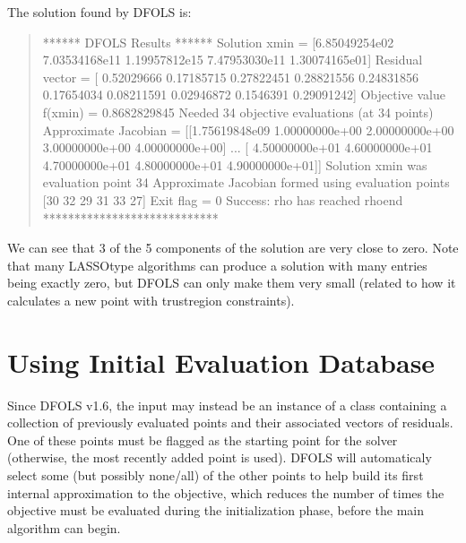 \documentclass[letterpaper,10pt,english]{sphinxmanual}
\begin{document}
\sphinxAtStartPar
The solution found by DFO\sphinxhyphen{}LS is:
\begin{quote}

\begin{sphinxVerbatim}[commandchars=\\\{\}]
****** DFO\PYGZhy{}LS Results ******
Solution xmin = [\PYGZhy{}6.85049254e\PYGZhy{}02 \PYGZhy{}7.03534168e\PYGZhy{}11  1.19957812e\PYGZhy{}15  7.47953030e\PYGZhy{}11
  1.30074165e\PYGZhy{}01]
Residual vector = [ 0.52029666 \PYGZhy{}0.17185715 \PYGZhy{}0.27822451 \PYGZhy{}0.28821556 \PYGZhy{}0.24831856 \PYGZhy{}0.17654034
 \PYGZhy{}0.08211591  0.02946872  0.1546391   0.29091242]
Objective value f(xmin) = 0.8682829845
Needed 34 objective evaluations (at 34 points)
Approximate Jacobian = [[\PYGZhy{}1.75619848e\PYGZhy{}09  1.00000000e+00  2.00000000e+00  3.00000000e+00
   4.00000000e+00]
 ...
 [ 4.50000000e+01  4.60000000e+01  4.70000000e+01  4.80000000e+01
   4.90000000e+01]]
Solution xmin was evaluation point 34
Approximate Jacobian formed using evaluation points [30 32 29 31 33 27]
Exit flag = 0
Success: rho has reached rhoend
****************************
\end{sphinxVerbatim}
\end{quote}

\sphinxAtStartPar
We can see that 3 of the 5 components of the solution are very close to zero.
Note that many LASSO\sphinxhyphen{}type algorithms can produce a solution with many entries being exactly zero, but DFO\sphinxhyphen{}LS can only make them very small (related to how it calculates a new point with trust\sphinxhyphen{}region constraints).


\section{Using Initial Evaluation Database}
\label{\detokenize{userguide:using-initial-evaluation-database}}
\sphinxAtStartPar
Since DFO\sphinxhyphen{}LS v1.6, the input  may instead be an instance of a  class containing a collection of previously evaluated
points and their associated vectors of residuals. One of these points must be flagged as the starting point for the solver (otherwise, the most recently added
point is used). DFO\sphinxhyphen{}LS will automaticaly select some (but possibly none/all) of the other points to help build its first internal approximation to the objective,
which reduces the number of times the objective must be evaluated during the initialization phase, before the main algorithm can begin.
\end{document}
